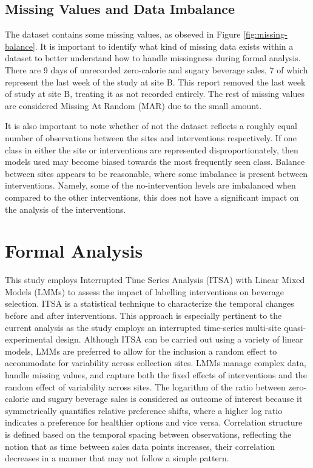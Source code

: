 \documentclass[
]{article}
\begin{document}
\hypertarget{missing-values-and-data-imbalance}{%
\subsection{Missing Values and Data Imbalance}\label{missing-values-and-data-imbalance}}

The dataset contains some missing values, as obseved in Figure \ref{fig:missing-balance}. It is important to identify what kind of missing data exists within a dataset to better understand how to handle missingness during formal analysis. There are 9 days of unrecorded zero-calorie and sugary beverage sales, 7 of which represent the last week of the study at site B. This report removed the last week of study at site B, treating it as not recorded entirely. The rest of missing values are considered Missing At Random (MAR) due to the small amount.

It is also important to note whether of not the dataset reflects a roughly equal number of observations between the sites and interventions respectively. If one class in either the site or interventions are represented disproportionately, then models used may become biased towards the most frequently seen class. Balance between sites appears to be reasonable, where some imbalance is present between interventions. Namely, some of the no-intervention levels are imbalanced when compared to the other interventions, this does not have a significant impact on the analysis of the interventions.

\hypertarget{formal-analysis}{%
\section{Formal Analysis}\label{formal-analysis}}

This study employs Interrupted Time Series Analysis (ITSA) with Linear Mixed Models (LMMs) to assess the impact of labelling interventions on beverage selection. ITSA is a statistical technique to characterize the temporal changes before and after interventions. This approach is especially pertinent to the current analysis as the study employs an interrupted time-series multi-site quasi-experimental design. Although ITSA can be carried out using a variety of linear models, LMMs are preferred to allow for the inclusion a random effect to accommodate for variability across collection sites. LMMs manage complex data, handle missing values, and capture both the fixed effects of interventions and the random effect of variability across sites. The logarithm of the ratio between zero-calorie and sugary beverage sales is considered as outcome of interest because it symmetrically quantifies relative preference shifts, where a higher log ratio indicates a preference for healthier options and vice versa. Correlation structure is defined based on the temporal spacing between observations, reflecting the notion that as time between sales data points increases, their correlation decreases in a manner that may not follow a simple pattern.
\end{document}
